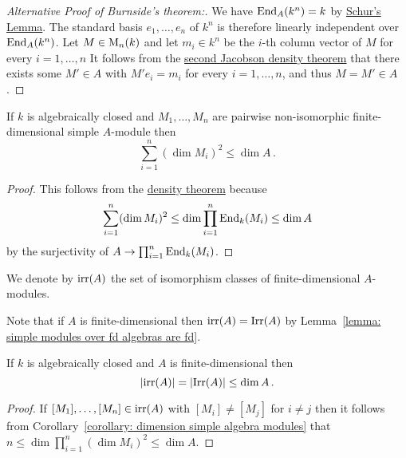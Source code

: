 \begin{proof}[Alternative Proof of Burnside’s theorem:]
  We have $\operatorname{End}_A(k^n) = k$ by \hyperref[proposition: schurs lemma for modules]{Schur’s Lemma}.
  The standard basis $e_1, \dotsc, e_n$ of $k^n$ is therefore linearly independent over $\operatorname{End}_A(k^n)$.
  Let $M \in \operatorname{M}_n(k)$ and let $m_i \in k^n$ be the $i$-th column vector of $M$ for every $i = 1, \dotsc, n$
  It follows from the \hyperref[theorem: second jacobson density theorem]{second Jacobson density theorem} that there exists some $M' \in A$ with $M' e_i = m_i$ for every $i = 1, \dotsc, n$, and thus $M = M' \in A$.
\end{proof}




\begin{corollary}
  \label{corollary: dimension simple algebra modules}
  If $k$ is algebraically closed and $M_1, \dotsc, M_n$ are pairwise non-iso\-morphic finite-dimensional simple $A$-module then
  \[
          \sum_{i=1}^n (\dim M_i)^2
    \leq  \dim A \,.
  \]
\end{corollary}


\begin{proof}
  This follows from the \hyperref[theorem: density theorem]{density theorem} because
  \[
          \sum_{i=1}^n (\dim M_i)^2
    \leq  \dim \prod_{i=1}^n \operatorname{End}_k(M_i)
    \leq  \dim A
  \]
  by the surjectivity of $A \to \prod_{i=1}^n \operatorname{End}_k(M_i)$.
\end{proof}




\begin{notation}
  We denote by $\operatorname{irr}(A)$ the set of isomorphism classes of finite-dimen\-sional $A$-modules.
\end{notation}


\begin{fluff}
  Note that if $A$ is finite-dimensional then $\operatorname{irr}(A) = \operatorname{Irr}(A)$ by Lemma~\ref{lemma: simple modules over fd algebras are fd}.
\end{fluff}


\begin{corollary}
  If $k$ is algebraically closed and $A$ is finite-dimensional then
  \[
          |{\operatorname{irr}(A)}|
    =     |{\operatorname{Irr}(A)}|
    \leq  \dim A \,.
  \]
\end{corollary}


\begin{proof}
  If $[M_1], \dotsc, [M_n] \in \operatorname{irr}(A)$ with $[M_i] \neq [M_j]$ for $i \neq j$ then it follows from Corollary~\ref{corollary: dimension simple algebra modules} that $n \leq  \dim \prod_{i=1}^n (\dim M_i)^2 \leq \dim A$.
\end{proof}





